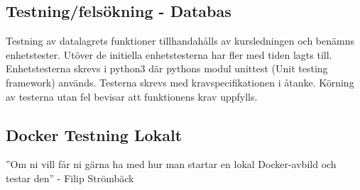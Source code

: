 \documentclass{TDP003mall}
\begin{document}
\subsection{Testning/felsökning - Databas}
Testning av datalagrets funktioner tillhandahålls av kursledningen och benämns enhetstester. Utöver de initiella enhetstesterna har fler med tiden lagts till. Enhetstesterna skrevs i python3 där pythons modul unittest (Unit testing framework) används. Testerna skrevs med kravspecifikationen i åtanke. Körning av testerna utan fel bevisar att funktionens krav uppfylls.

\subsection{Docker Testning Lokalt}
''Om ni vill får ni gärna ha med hur man startar en lokal Docker-avbild och testar den'' - Filip Strömbäck
\end{document}
